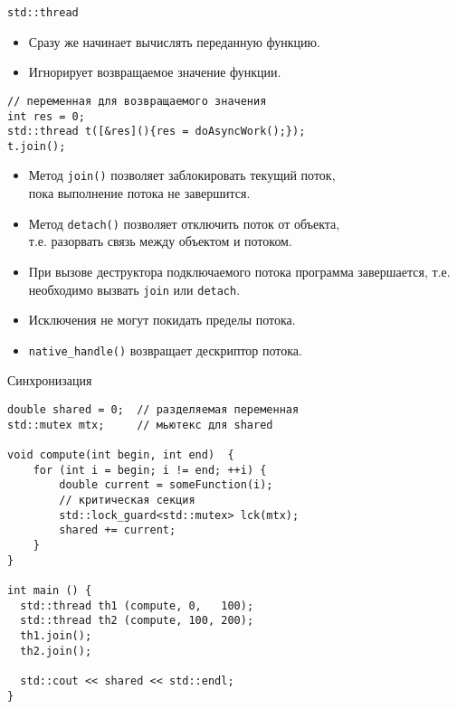 \documentclass{beamer}
\begin{document}
\begin{frame}[fragile]{\texttt{std::thread}}
    \begin{itemize}
        \item Сразу же начинает вычислять переданную функцию.

        \item Игнорирует возвращаемое значение функции.
    \end{itemize}
\begin{lstlisting}
// переменная для возвращаемого значения
int res = 0;
std::thread t([&res](){res = doAsyncWork();});
t.join();
\end{lstlisting}    
       
    \begin{itemize}
        \item Метод \texttt{join()} позволяет заблокировать текущий поток,\\ пока
            выполнение потока не завершится.

        \item Метод \texttt{detach()} позволяет отключить поток от объекта,\\
            т.е. разорвать связь между объектом и потоком.

        \item При вызове деструктора подключаемого потока программа
            завершается, т.е. необходимо вызвать \texttt{join} или \texttt{detach}.

                   
        \item Исключения не могут покидать пределы потока.
        
        
        \item \texttt{native\_handle()} возвращает дескриптор потока.
    \end{itemize}


\end{frame}

\begin{frame}[fragile]{Синхронизация}
    \begin{lstlisting}
double shared = 0;	// разделяемая переменная
std::mutex mtx; 	// мьютекс для shared

void compute(int begin, int end)  {
    for (int i = begin; i != end; ++i) {
        double current = someFunction(i);        
        // критическая секция
        std::lock_guard<std::mutex> lck(mtx);
        shared += current;        
    }
}

int main () {
  std::thread th1 (compute, 0,   100);
  std::thread th2 (compute, 100, 200);
  th1.join();
  th2.join();

  std::cout << shared << std::endl;
}
\end{lstlisting}
\end{frame}
\end{document}
